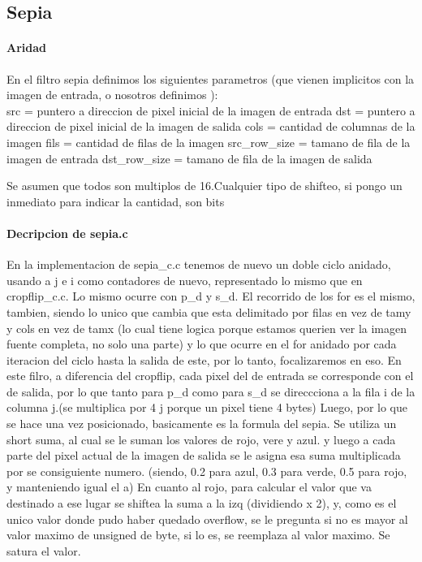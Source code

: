\documentclass[a4paper]{article}
\begin{document}
     
          
     
     
     
     
      
       
      


 
	  
	 
\subsection{Sepia}

\paragraph{\textbf{Aridad}}
\hfill \break
En el filtro sepia definimos los  siguientes parametros (que vienen implicitos con la imagen de entrada, o nosotros definimos ):
\hfill \break
\\
src = puntero a direccion de pixel inicial de la imagen de entrada
\hfill \break
dst = puntero a direccion de pixel inicial de la imagen de salida
\hfill \break
cols = cantidad de columnas de la imagen
fils = cantidad de filas de la imagen
src_row_size = tamano de fila de la imagen de entrada
dst_row_size = tamano de fila de la imagen de salida 

Se asumen que todos son multiplos de 16.Cualquier tipo de shifteo, si pongo un inmediato para indicar la cantidad, son bits

\paragraph{\textbf{Decripcion de sepia.c}}
\hfill \break
 	En la implementacion de sepia_c.c tenemos de nuevo un doble ciclo anidado, usando a j e i como contadores de nuevo, representado lo mismo que en cropflip_c.c. Lo mismo ocurre con p_d y s_d. El recorrido de los for es el mismo, tambien, siendo lo unico que cambia que esta delimitado por filas en vez de tamy y cols en vez de tamx (lo cual tiene logica porque estamos querien ver la imagen fuente completa, no solo una parte) y  lo que ocurre en el for anidado por cada iteracion del ciclo hasta la salida de este, por lo tanto, focalizaremos en eso.
 	\hfill \break
 	En este filro, a diferencia del cropflip, cada pixel del de entrada se corresponde con el de salida, por lo que tanto para p_d como para s_d se direccciona a la fila i de la columna j.(se multiplica por 4 j porque un pixel tiene 4 bytes)
 	\hfill \break
 	Luego, por lo que se hace una vez posicionado, basicamente es la formula del sepia. Se utiliza un short suma, al cual se le suman los valores de rojo, vere y azul. y luego a cada parte del pixel actual de la imagen de salida se le asigna esa suma multiplicada por se consiguiente numero. (siendo, 0.2 para azul, 0.3 para verde, 0.5 para rojo, y manteniendo igual el a)
 	\hfill \break
 	En cuanto al rojo, para calcular el valor que va destinado a ese lugar se shiftea la suma a la izq (dividiendo x 2), y, como es el unico valor donde pudo haber quedado overflow, se le pregunta si no es mayor al valor maximo de unsigned de byte, si lo es, se reemplaza al valor maximo. Se satura el valor.
 	\hfill \break
 	
\end{document}

